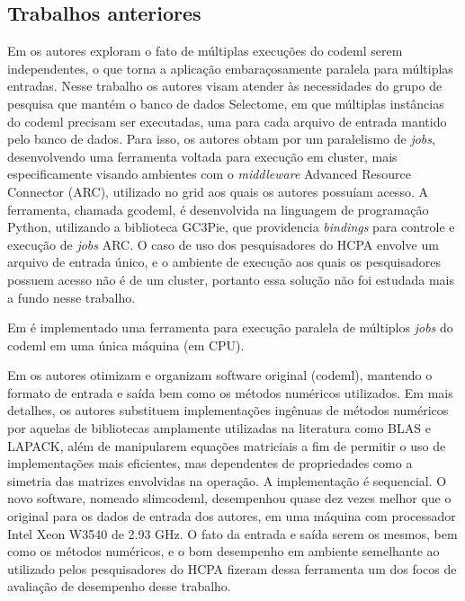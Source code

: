 \documentclass[cic,tc]{iiufrgs}
\begin{document}
\subsection{Trabalhos anteriores}

Em \cite{moretti2012gcodeml} os autores exploram o fato de múltiplas execuções
do codeml serem independentes, o que torna a aplicação embaraçosamente
paralela para múltiplas entradas. Nesse trabalho os autores visam atender às
necessidades do grupo de pesquisa que mantém o banco de dados Selectome, em
que múltiplas instâncias do codeml precisam ser executadas, uma para cada
arquivo de entrada mantido pelo banco de dados. Para isso, os autores obtam
por um paralelismo de \textit{jobs}, desenvolvendo uma ferramenta voltada
para execução em cluster, mais especificamente visando ambientes com o
\textit{middleware} Advanced Resource Connector (ARC), utilizado no grid aos
quais os autores possuíam acesso. A ferramenta, chamada gcodeml, é desenvolvida
na linguagem de programação Python, utilizando a biblioteca GC3Pie, que
providencia \textit{bindings} para controle e execução de \textit{jobs} ARC. O
caso de uso dos pesquisadores do HCPA envolve um arquivo de entrada único, e
o ambiente de execução aos quais os pesquisadores possuem acesso não é de um
cluster, portanto essa solução não foi estudada mais a fundo nesse trabalho.

Em \cite{maldonado2016lmap} é implementado uma
ferramenta para execução paralela de múltiplos \textit{jobs} do codeml
em uma única máquina (em CPU). %

Em \cite{schabauer2012slimcodeml} os autores otimizam e organizam software
original (codeml), mantendo o formato de entrada e saída bem como os métodos
numéricos utilizados. Em mais detalhes, os autores substituem implementações
ingênuas de métodos numéricos por aquelas de bibliotecas amplamente utilizadas
na literatura como BLAS e LAPACK, além de manipularem equações matriciais a fim
de permitir o uso de implementações mais eficientes, mas dependentes de
propriedades como a simetria das matrizes envolvidas na operação. A
implementação é sequencial. O novo software, nomeado slimcodeml, desempenhou
quase dez vezes melhor que o original para os dados de entrada dos autores, em
uma máquina com processador Intel Xeon W3540 de 2.93 GHz. O fato da entrada e
saída serem os mesmos, bem como os métodos numéricos, e o bom desempenho em
ambiente semelhante ao utilizado pelos pesquisadores do HCPA fizeram dessa
ferramenta um dos focos de avaliação de desempenho desse trabalho.
\end{document}
